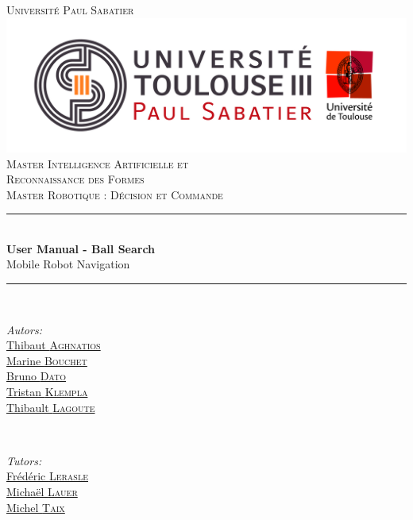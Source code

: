 \documentclass[10pt,a4paper]{article}
\begin{document}
\pagestyle {plain}

\begin{titlepage}


\newcommand{\HRule}{\rule{\linewidth}{0.5mm}} 

\center

\textsc{\Large Université Paul Sabatier}\\[1cm] 
\includegraphics[scale=0.3]{UPS.jpg}\\[0.6cm] 


\textsc{Master Intelligence Artificielle et \\ 
Reconnaissance des Formes \\ Master Robotique : Décision et Commande}\\[3cm] 

\HRule \\[0.4cm]
{ \huge \bfseries User Manual - Ball Search}\\[0.4cm] 
\LARGE Mobile Robot Navigation

\HRule \\[1.5cm]
 

\begin{minipage}{0.4\textwidth}
\begin{flushleft} \large
\emph{Autors:}\\
\href{mailto:thibaut.aghnatios@laposte.net}{Thibaut \textsc{Aghnatios} }  \\
\href{mailto:bouchetmarinee@gmail.com}{Marine \textsc{Bouchet} } \\
\href{mailto:bruno.dato.meneses@gmail.com}{Bruno \textsc{Dato} } \\
\href{mailto:klempka.tristan@gmail.com}{Tristan \textsc{Klempla} } \\
\href{mailto:lagoute.31@gmail.com}{Thibault \textsc{Lagoute} }  
\end{flushleft}
\end{minipage}
~
\begin{minipage}{0.4\textwidth}
\begin{flushright} \large
\emph{Tutors:} \\
\href{mailto:lerasle@laas.fr}{Frédéric \textsc{Lerasle}}\\
\href{mailto:michael.lauer@laas.fr}{Michaël \textsc{Lauer}} \\
\href{mailto:taix@laas.f}{Michel \textsc{Taix}}
\end{flushright}
\end{minipage}\\[5cm]


\end{titlepage}
\end{document}
